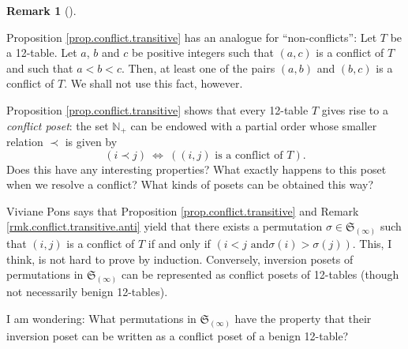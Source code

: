 \documentclass[numbers=enddot,12pt,final,onecolumn,notitlepage]{scrartcl}%
\theoremstyle{definition}
\newtheorem{remk}[theo]{Remark}
\newenvironment{remark}[1][]
{\begin{remk}[#1]\begin{leftbar}}
{\end{leftbar}\end{remk}}
\newenvironment{todo}{}{}
\begin{document}
\begin{remark}
\label{rmk.conflict.transitive.anti}Proposition \ref{prop.conflict.transitive}
has an analogue for \textquotedblleft non-conflicts\textquotedblright: Let $T$
be a 12-table. Let $a$, $b$ and $c$ be positive integers such that $\left(
a,c\right)  $ is a conflict of $T$ and such that $a<b<c$. Then, at least one
of the pairs $\left(  a,b\right)  $ and $\left(  b,c\right)  $ is a conflict
of $T$. We shall not use this fact, however.
\end{remark}

\begin{todo}
Proposition \ref{prop.conflict.transitive} shows that every 12-table $T$ gives
rise to a \textit{conflict poset}: the set $\mathbb{N}_{+}$ can be endowed
with a partial order whose smaller relation $\prec$ is given by%
\[
\left(  i\prec j\right)  \ \Longleftrightarrow\ \left(  \left(  i,j\right)
\text{ is a conflict of }T\right)  .
\]
Does this have any interesting properties? What exactly happens to this poset
when we resolve a conflict? What kinds of posets can be obtained this way?

Viviane Pons says that Proposition \ref{prop.conflict.transitive} and Remark
\ref{rmk.conflict.transitive.anti} yield that there exists a permutation
$\sigma\in\mathfrak{S}_{\left(  \infty\right)  }$ such that $\left(
i,j\right)  $ is a conflict of $T$ if and only if $\left(  i<j\text{ and
}\sigma\left(  i\right)  >\sigma\left(  j\right)  \right)  $. This, I think,
is not hard to prove by induction. Conversely, inversion posets of
permutations in $\mathfrak{S}_{\left(  \infty\right)  }$ can be represented as
conflict posets of 12-tables (though not necessarily benign 12-tables).

I am wondering: What permutations in $\mathfrak{S}_{\left(  \infty\right)  }$
have the property that their inversion poset can be written as a conflict
poset of a benign 12-table?
\end{todo}
\end{document}
